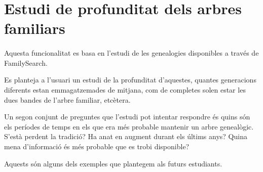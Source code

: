 \section{Estudi de profunditat dels arbres familiars}

    \paragraph{}
    Aquesta funcionalitat es basa en l'estudi de les genealogies disponibles a través de FamilySearch.

    Es planteja a l'usuari un estudi de la profunditat d'aquestes, quantes generacions diferents estan emmagatzemades de mitjana, com de completes solen estar les dues bandes de l'arbre familiar, etcètera.

    Un segon conjunt de preguntes que l'estudi pot intentar respondre és quins són els períodes de temps en els que era més probable mantenir un arbre genealògic. S'està perdent la tradició? Ha anat en augment durant els últims anys? Quina mena d'informació és més probable que es trobi disponible?

    Aquests són alguns dels exemples que plantegem als futurs estudiants.
